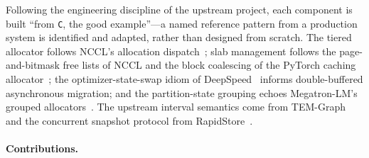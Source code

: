 \documentclass[10pt]{article}
\theoremstyle{definition}
\begin{document}
Following the engineering discipline of the upstream project, each component is
built ``from \texttt{C}, the good example''---a named reference pattern from a
production system is identified and adapted, rather than designed from scratch. The
tiered allocator follows NCCL's allocation dispatch~\citep{nccl}; slab management
follows the page-and-bitmask free lists of NCCL and the block coalescing of the
PyTorch caching allocator~\citep{paszke2019pytorch}; the optimizer-state-swap idiom
of DeepSpeed~\citep{rasley2020deepspeed} informs double-buffered asynchronous
migration; and the partition-state grouping echoes Megatron-LM's grouped
allocators~\citep{shoeybi2019megatron}. The upstream interval semantics come from
TEM-Graph~\citep{temgraph} and the concurrent snapshot protocol from
RapidStore~\citep{rapidstore}.

\paragraph{Contributions.}
\end{document}
